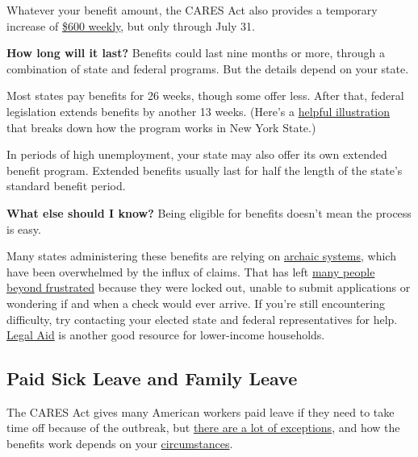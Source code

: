 Whatever your benefit amount, the CARES Act also provides a temporary
increase of
\href{https://www.nytimes3xbfgragh.onion/interactive/2020/04/23/business/economy/unemployment-benefits-stimulus-coronavirus.html}{\$600
weekly}, but only through July 31.

\textbf{How long will it last?} Benefits could last nine months or more,
through a combination of state and federal programs. But the details
depend on your state.

Most states pay benefits for 26 weeks, though some offer less. After
that, federal legislation extends benefits by another 13 weeks. (Here's
a \href{https://labor.ny.gov/ui/cares-act.shtm}{helpful illustration}
that breaks down how the program works in New York State.)

In periods of high unemployment, your state may also offer its own
extended benefit program. Extended benefits usually last for half the
length of the state's standard benefit period.

\textbf{What else should I know?} Being eligible for benefits doesn't
mean the process is easy.

Many states administering these benefits are relying on
\href{https://www.nytimes3xbfgragh.onion/2020/04/17/nyregion/coronavirus-pandemic-unemployment-assistance-ny-delays.html}{archaic
systems}, which have been overwhelmed by the influx of claims. That has
left
\href{https://www.nytimes3xbfgragh.onion/2020/04/23/us/florida-coronavirus-unemployment.html}{many
people}
\href{https://www.nytimes3xbfgragh.onion/2020/05/08/nyregion/unemployment-benefits-ny-coronavirus.html}{beyond
frustrated} because they were locked out, unable to submit applications
or wondering if and when a check would ever arrive. If you're still
encountering difficulty, try contacting your elected state and federal
representatives for help.
\href{https://www.americanbar.org/groups/legal_services/flh-home/flh-free-legal-help/}{Legal
Aid} is another good resource for lower-income households.

\hypertarget{paid-sick-leave-and-family-leave}{%
\subsection{Paid Sick Leave and Family
Leave}\label{paid-sick-leave-and-family-leave}}

The CARES Act gives many American workers paid leave if they need to
take time off because of the outbreak, but
\href{https://www.nytimes3xbfgragh.onion/2020/03/14/opinion/coronavirus-pelosi-sick-leave.html}{there
are a lot of exceptions,} and how the benefits work depends on your
\href{https://www.nytimes3xbfgragh.onion/2020/05/08/upshot/virus-paid-leave-pandemic.html}{circumstances}.

